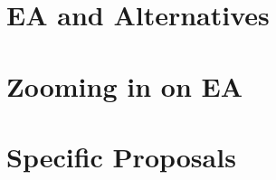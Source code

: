 \section{EA and Alternatives}

\section{Zooming in on EA}




\section{Specific Proposals}


















